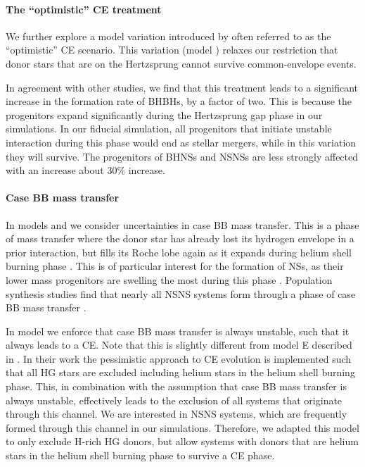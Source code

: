 \paragraph{The ``optimistic'' CE treatment} We further explore a model variation introduced by \citet{Belczynski+2007} often referred to as the ``optimistic'' CE scenario. This variation (model \modOpt{}) relaxes our restriction that donor stars that are on the Hertzsprung cannot survive common-envelope events.

In agreement with other studies, we find that this treatment leads to a significant increase in the formation rate of BHBHs, by a factor of two. This is because the progenitors expand significantly during the Hertzsprung gap phase in our simulations. In our fiducial simulation, all progenitors that initiate unstable interaction during this phase would end as stellar mergers, while in this variation they will survive. The progenitors of BHNSs and NSNSs are less strongly affected with an increase about 30\% increase.

\paragraph{Case BB mass transfer} In models \modCaseBB{} and \modCaseBBOpt{} we consider uncertainties in case BB mass transfer. This is a phase of mass transfer where the donor star has already lost its hydrogen envelope in a prior interaction, but fills its Roche lobe again as it expands during helium shell burning phase \citep[e.g.][]{Dewi+2002, Tauris+2015, Tauris+2017}. This is of particular interest for the formation of NSs, as their lower mass progenitors are swelling the most during this phase \citep[e.g.][and references therein]{Laplace+2020}. Population synthesis studies find that nearly all NSNS systems form through a phase of case BB mass transfer \citep{Vigna-Gomez+2018}.

In model \modCaseBB{} we enforce that case BB mass transfer is always unstable, such that it always leads to a CE. Note that this is slightly different from model E described in \citet{Broekgaarden+2021,Broekgaarden+2021b}. In their work the pessimistic approach to CE evolution is implemented such that all HG stars are excluded including helium stars in the helium shell burning phase. This, in combination with the assumption that case BB mass transfer is always unstable, effectively leads to the exclusion of all systems that originate through this channel. We are interested in NSNS systems, which are frequently formed through this channel in our simulations. Therefore, we adapted this model to only exclude H-rich HG donors, but allow systems with donors that are helium stars in the helium shell burning phase to survive a CE phase.


